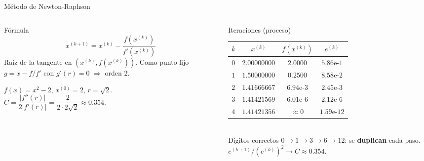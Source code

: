 \documentclass[aspectratio=169,10pt]{beamer}
\begin{document}
\begin{frame}{Método de Newton-Raphson}
\begin{columns}[T]
\begin{column}{0.42\textwidth}
\begin{cardidea}{Fórmula}{\faSuperscript}
$$x^{(k+1)}=x^{(k)}-\frac{f(x^{(k)})}{f'(x^{(k)})}$$
{\footnotesize Raíz de la tangente en $(x^{(k)},f(x^{(k)}))$. Como punto fijo $g=x-f/f'$ con $g'(r)=0$ $\Rightarrow$ orden $2$.}
\end{cardidea}
\vspace{1mm}
\begin{cardnota}[\faListOl]
{\footnotesize $f(x)=x^2-2$, $x^{(0)}=2$, $r=\sqrt2$.\\[0.4mm]
$C=\dfrac{|f''(r)|}{2|f'(r)|}=\dfrac{2}{2\cdot2\sqrt2}\approx0.354$.}
\end{cardnota}
\end{column}
\begin{column}{0.56\textwidth}
\begin{cardgear}{Iteraciones (proceso)}{\faTable}
\centering
{\footnotesize\renewcommand{\arraystretch}{1.22}\setlength{\tabcolsep}{4pt}
\begin{tabular}{c|ccc}
$k$ & $x^{(k)}$ & $f(x^{(k)})$ & $e^{(k)}$\\\hline
$0$&$2.00000000$&$2.0000$&$5.86\text{e-}1$\\
$1$&$1.50000000$&$0.2500$&$8.58\text{e-}2$\\
$2$&$1.41666667$&$6.94\text{e-}3$&$2.45\text{e-}3$\\
$3$&$1.41421569$&$6.01\text{e-}6$&$2.12\text{e-}6$\\
$4$&$1.41421356$&$\approx0$&$1.59\text{e-}12$\\
\end{tabular}}\\[1.2mm]
{\footnotesize Dígitos correctos $0{\to}1{\to}3{\to}6{\to}12$: se \textbf{duplican} cada paso. $e^{(k+1)}/(e^{(k)})^2\to C\approx0.354$.}
\end{cardgear}
\end{column}
\end{columns}
\end{frame}
\end{document}
